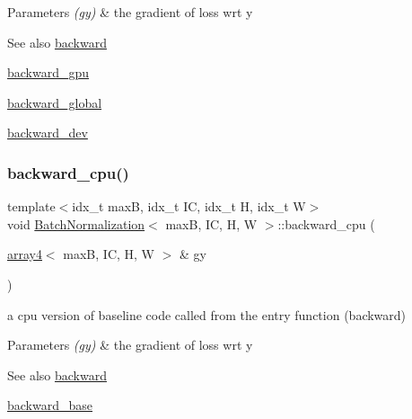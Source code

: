 \begin{DoxyParams}{Parameters}
{\em (gy)} & the gradient of loss wrt y \\
\hline
\end{DoxyParams}
\begin{DoxySeeAlso}{See also}
\hyperlink{structBatchNormalization_a3b6d987026effdc6c3a2c99e54ae58f9}{backward} 

\hyperlink{structBatchNormalization_a2a80a633ecc4a5ed378dd0ff70d275e1}{backward\+\_\+gpu} 

\hyperlink{softmaxcrossentropy_8h_a47d56a9a23e08247b227f4aac17413e0}{backward\+\_\+global} 

\hyperlink{structBatchNormalization_a3c96c56393798abdb00647aae73b197a}{backward\+\_\+dev} 
\end{DoxySeeAlso}
\mbox{\label{structBatchNormalization_af60d17f3a0af3a4fd8556a93eddcf7c9}} 
\subsubsection{\texorpdfstring{backward\+\_\+cpu()}{backward\_cpu()}}
{\footnotesize\ttfamily template$<$idx\+\_\+t maxB, idx\+\_\+t IC, idx\+\_\+t H, idx\+\_\+t W$>$ \\
void \hyperlink{structBatchNormalization}{Batch\+Normalization}$<$ maxB, IC, H, W $>$\+::backward\+\_\+cpu (\begin{DoxyParamCaption}\item[{\hyperlink{structarray4}{array4}$<$ maxB, IC, H, W $>$ \&}]{gy }\end{DoxyParamCaption})\hspace{0.3cm}{\ttfamily [inline]}}



a cpu version of baseline code called from the entry function (backward) 


\begin{DoxyParams}{Parameters}
{\em (gy)} & the gradient of loss wrt y \\
\hline
\end{DoxyParams}
\begin{DoxySeeAlso}{See also}
\hyperlink{structBatchNormalization_a3b6d987026effdc6c3a2c99e54ae58f9}{backward} 

\hyperlink{structBatchNormalization_a0ef45335c50151f68de03d33b1d226ca}{backward\+\_\+base} 
\end{DoxySeeAlso}
\mbox{\label{structBatchNormalization_a3c96c56393798abdb00647aae73b197a}} 
